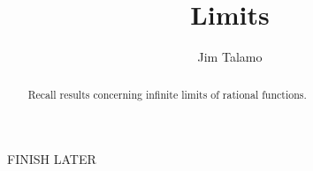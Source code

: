 \documentclass{ximera}
\author{Jim Talamo}
\title[Refresh:]{Limits}
\begin{document}
\begin{abstract}
Recall results concerning infinite limits of rational functions.
\end{abstract}
\maketitle

\begin{problem}

FINISH LATER


\end{problem}
\end{document}

